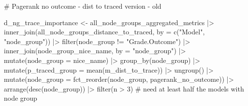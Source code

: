 \documentclass[
  letterpaper,
  DIV=11,
  numbers=noendperiod]{scrartcl}
\newenvironment{Shaded}{\begin{snugshade}}{\end{snugshade}}
\newcommand{\AttributeTok}[1]{\textcolor[rgb]{0.40,0.45,0.13}{#1}}
\newcommand{\CommentTok}[1]{\textcolor[rgb]{0.37,0.37,0.37}{#1}}
\newcommand{\DecValTok}[1]{\textcolor[rgb]{0.68,0.00,0.00}{#1}}
\newcommand{\FunctionTok}[1]{\textcolor[rgb]{0.28,0.35,0.67}{#1}}
\newcommand{\NormalTok}[1]{\textcolor[rgb]{0.00,0.23,0.31}{#1}}
\newcommand{\OtherTok}[1]{\textcolor[rgb]{0.00,0.23,0.31}{#1}}
\newcommand{\SpecialCharTok}[1]{\textcolor[rgb]{0.37,0.37,0.37}{#1}}
\newcommand{\StringTok}[1]{\textcolor[rgb]{0.13,0.47,0.30}{#1}}
\begin{document}
\begin{Shaded}
\begin{Highlighting}[]
\CommentTok{\# Pagerank no outcome {-} dist to traced version {-} old}

\NormalTok{d\_ng\_trace\_importance }\OtherTok{\textless{}{-}} 
\NormalTok{    all\_node\_groups\_aggregated\_metrics }\SpecialCharTok{|\textgreater{}} 
    \FunctionTok{inner\_join}\NormalTok{(all\_node\_groups\_distance\_to\_traced, }\AttributeTok{by =} \FunctionTok{c}\NormalTok{(}\StringTok{"Model"}\NormalTok{, }\StringTok{"node\_group"}\NormalTok{)) }\SpecialCharTok{|\textgreater{}} 
    \FunctionTok{filter}\NormalTok{(node\_group }\SpecialCharTok{!=} \StringTok{"Grade.Outcome"}\NormalTok{) }\SpecialCharTok{|\textgreater{}}
    \FunctionTok{inner\_join}\NormalTok{(node\_group\_nice\_name, }\AttributeTok{by =} \StringTok{"node\_group"}\NormalTok{) }\SpecialCharTok{|\textgreater{}}
    \FunctionTok{mutate}\NormalTok{(}\AttributeTok{node\_group =}\NormalTok{ nice\_name) }\SpecialCharTok{|\textgreater{}}
    \FunctionTok{group\_by}\NormalTok{(node\_group) }\SpecialCharTok{|\textgreater{}}
    \FunctionTok{mutate}\NormalTok{(}\AttributeTok{p\_traced\_group =} \FunctionTok{mean}\NormalTok{(m\_dist\_to\_trace)) }\SpecialCharTok{|\textgreater{}}
    \FunctionTok{ungroup}\NormalTok{() }\SpecialCharTok{|\textgreater{}} 
    \FunctionTok{mutate}\NormalTok{(}\AttributeTok{node\_group =} \FunctionTok{fct\_reorder}\NormalTok{(node\_group, pagerank\_no\_outcome)) }\SpecialCharTok{|\textgreater{}} 
    \FunctionTok{arrange}\NormalTok{(}\FunctionTok{desc}\NormalTok{(node\_group)) }\SpecialCharTok{|\textgreater{}} 
    \FunctionTok{filter}\NormalTok{(n }\SpecialCharTok{\textgreater{}} \DecValTok{3}\NormalTok{) }\CommentTok{\# need at least half the models with node group}



\end{Highlighting}
\end{Shaded}
\end{document}
